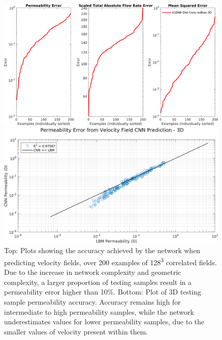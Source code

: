 \documentclass{article}
\begin{document}
\begin{figure}[htp!]
  \centering
    \includegraphics[width=\textwidth]{./figures/velCNNsParamCompare3D1.png}
     \begin{minipage}[b]{0.5\textwidth}
    \includegraphics[width=\textwidth]{./figures/permvperm3d.png}
    \end{minipage}
    \caption{Top: Plots showing the accuracy achieved by the network when predicting velocity fields, over 200 examples of 128\textsuperscript{3} correlated fields.  Due to the increase in network complexity and geometric complexity, a larger proportion of testing samples result in a permeability error higher than 10\%. Bottom: Plot of 3D testing sample permeability accuracy. Accuracy remains high for intermediate to high permeability samples, while the network underestimates values for lower permeability samples, due to the smaller values of velocity present within them.}
    \label{fig:error3dpermvperm}
\end{figure}
\end{document}
